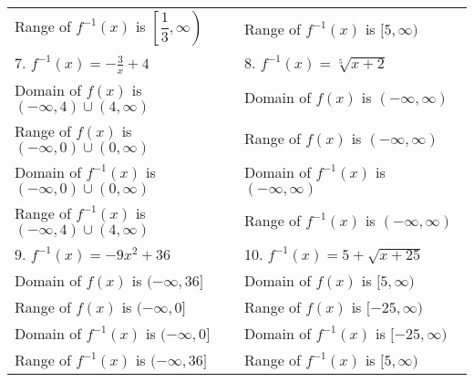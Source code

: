 \documentclass[11pt]{article}
\begin{document}
\begin{tabular}{p{0.5\linewidth}p{0.5\linewidth}}
Range of $f^{-1}(x)$ is $\left[\dfrac{1}{3}, \infty\right)$ &
Range of $f^{-1}(x)$ is $[5, \infty)$   \\[0.35in]


    
    
    
7. $f^{-1}(x) = -\frac{3}{x} + 4$   &
8. $f^{-1}(x) = \sqrt[5]{x+2}$      \\[0.15in]

Domain of $f(x)$ is $(-\infty, 4) \cup (4, \infty)$ &
Domain of $f(x)$ is $(-\infty, \infty)$ \\[0.15in]

Range of $f(x)$ is $(-\infty, 0) \cup (0, \infty)$  &
Range of $f(x)$ is $(-\infty, \infty)$ \\[0.15in]

Domain of $f^{-1}(x)$ is $(-\infty, 0) \cup (0, \infty)$  &
Domain of $f^{-1}(x)$ is $(-\infty, \infty)$ \\[0.15in]
    
Range of $f^{-1}(x)$ is $(-\infty, 4) \cup (4, \infty)$ &  
Range of $f^{-1}(x)$ is $(-\infty, \infty)$ \\[0.35in]



9. $f^{-1}(x) = -9x^2 + 36$ &   
10. $f^{-1}(x) = 5 + \sqrt{x+25}$\\[0.15in]

Domain of $f(x)$ is $(-\infty, 36]$ &
Domain of $f(x)$ is $[5, \infty)$   
\\[0.15in]

Range of $f(x)$ is $(-\infty, 0]$  &
Range of $f(x)$ is $[-25,\infty)$
\\[0.15in]

Domain of $f^{-1}(x)$ is $(-\infty, 0]$ &
Domain of $f^{-1}(x)$ is $[-25, \infty)$
\\[0.15in]

Range of $f^{-1}(x)$ is $(-\infty, 36]$ &
Range of $f^{-1}(x)$ is $[5, \infty)$
\\[0.15in]

\end{tabular}
\end{document}
